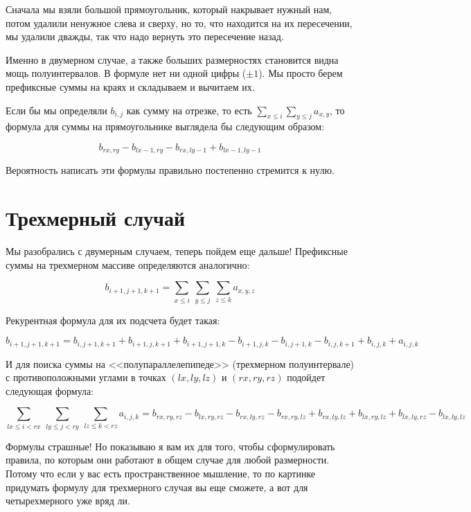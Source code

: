 
Сначала мы взяли большой прямоугольник, который накрывает нужный нам, потом удалили ненужное слева и сверху, но то, что находится на их пересечении, мы удалили дважды, так что надо вернуть это пересечение назад.

\begin{observation}
    Именно в двумерном случае, а также больших размерностях становится видна мощь полуинтервалов. В формуле нет ни одной цифры ($\pm 1$). Мы просто берем префиксные суммы на краях и складываем и вычитаем их.

    Если бы мы определяли $b_{i, j}$ как сумму на отрезке, то есть $\sum_{x \le i} \sum_{y \le j} a_{x, y}$, то формула для суммы на прямоугольнике выглядела бы следующим образом:

$$
b_{rx, ry} - b_{lx - 1, ry} - b_{rx, ly - 1} + b_{lx - 1, ly - 1}
$$

Вероятность написать эти формулы правильно постепенно стремится к нулю.
\end{observation}



\section{Трехмерный случай}

Мы разобрались с двумерным случаем, теперь пойдем еще дальше! Префиксные суммы на трехмерном массиве определяются аналогично:

$$
b_{i + 1, j + 1, k + 1} = \sum_{x \le i} \ \sum_{y \le j} \ \sum_{z \le k} a_{x, y, z}
$$

Рекурентная формула для их подсчета будет такая:

$$
b_{i + 1, j + 1, k + 1} = b_{i, j + 1, k + 1} + b_{i + 1, j, k + 1} + b_{i + 1, j + 1, k} - b_{i + 1, j, k} - b_{i, j + 1, k} - b_{i, j, k + 1} + b_{i, j, k} + a_{i, j, k}
$$

И для поиска суммы на <<полупараллелепипеде>> (трехмерном полуинтервале) с противоположными углами в точках $(lx, ly, lz)$ и $(rx, ry, rz)$ подойдет следующая формула:

$$
\sum_{lx \le i < rx} \ \sum_{ly \le j < ry} \ \sum_{lz \le k < rz} a_{i, j, k} = b_{rx, ry, rz} - b_{lx, ry, rz} - b_{rx, ly, rz} - b_{rx, ry, lz} + b_{rx, ly, lz} + b_{lx, ry, lz} + b_{lx, ly, rz} - b_{lx, ly, lz}
$$

Формулы страшные! Но показываю я вам их для того, чтобы сформулировать правила, по которым они работают в общем случае для любой размерности. Потому что если у вас есть пространственное мышление, то по картинке придумать формулу для трехмерного случая вы еще сможете, а вот для четырехмерного уже вряд ли.


